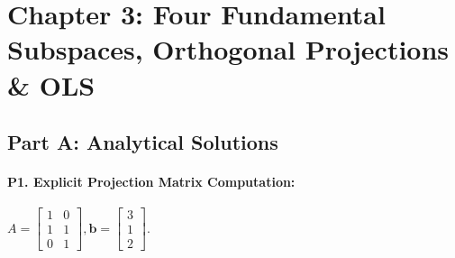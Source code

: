 \section*{Chapter 3: Four Fundamental Subspaces, Orthogonal Projections \& OLS}

\subsection*{Part A: Analytical Solutions}

\paragraph{P1. Explicit Projection Matrix Computation:}
$A = \begin{bmatrix} 1 & 0 \\ 1 & 1 \\ 0 & 1 \end{bmatrix}, \mathbf{b} = \begin{bmatrix} 3 \\ 1 \\ 2 \end{bmatrix}$.
